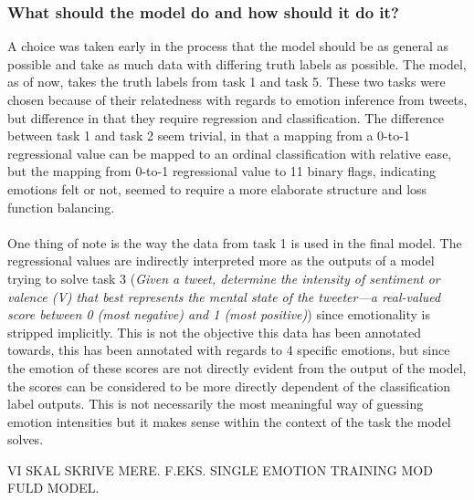 \subsubsection{What should the model do and how should it do it?}
A choice was taken early in the process that the model should be as general as possible and take as much data with differing truth labels as possible. The model, as of now, takes the truth labels from task 1 and task 5. These two tasks were chosen because of their relatedness with regards to emotion inference from tweets, but difference in that they require regression and classification. The difference between task 1 and task 2 seem trivial, in that a mapping from a 0-to-1 regressional value can be mapped to an ordinal classification with relative ease, but the mapping from 0-to-1 regressional value to 11 binary flags, indicating emotions felt or not, seemed to require a more elaborate structure and loss function balancing.\\
\\
One thing of note is the way the data from task 1 is used in the final model. The regressional values are indirectly interpreted more as the outputs of a model trying to solve task 3 (\textit{Given a tweet, determine the intensity of sentiment or valence (V) that best represents the mental state of the tweeter—a real-valued score between 0 (most negative) and 1 (most positive)}) since emotionality is stripped implicitly. This is not the objective this data has been annotated towards, this has been annotated with regards to 4 specific emotions, but since the emotion of these scores are not directly evident from the output of the model, the scores can be considered to be more directly dependent of the classification label outputs. This is not necessarily the most meaningful way of guessing emotion intensities but it makes sense within the context of the task the model solves.

VI SKAL SKRIVE MERE. 	F.EKS. SINGLE EMOTION TRAINING MOD FULD MODEL.\\


